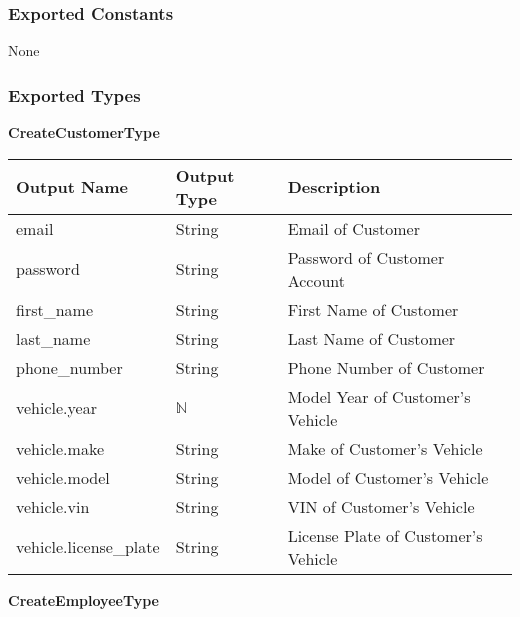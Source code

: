 \documentclass[12pt, titlepage]{article}
\begin{document}
\subsubsection{Exported Constants}

None

\subsubsection{Exported Types}

\textbf{CreateCustomerType}

\begin{table}[H]
	\begin{tabular}{|p{}|p{}|p{}|}
		\hline
		\textbf{Output Name}   & \textbf{Output Type} & \textbf{Description}                \\
		\hline
		email                  & String               & Email of Customer                   \\
		\hline
		password               & String               & Password of Customer Account        \\
		\hline
		first\_name            & String               & First Name of Customer              \\
		\hline
		last\_name             & String               & Last Name of Customer               \\
		\hline
		phone\_number          & String               & Phone Number of Customer            \\
		\hline
		vehicle.year           & $\mathbb{N}$         & Model Year of Customer's Vehicle    \\
		\hline
		vehicle.make           & String               & Make of Customer's Vehicle          \\
		\hline
		vehicle.model          & String               & Model of Customer's Vehicle         \\
		\hline
		vehicle.vin            & String               & VIN of Customer's Vehicle           \\
		\hline
		vehicle.license\_plate & String               & License Plate of Customer's Vehicle \\
		\hline
	\end{tabular}
\end{table}

\textbf{CreateEmployeeType}
\end{document}
